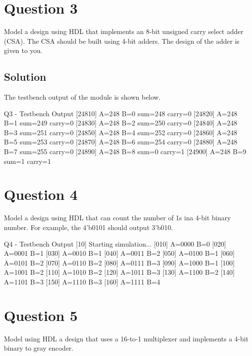 \documentclass[../main.tex]{subfiles}
\begin{document}
\newpage

\section{Question 3}

Model a design using HDL that implements an 8-bit unsigned carry select adder (CSA). The CSA should be built using 4-bit adders. The design of the adder is given to you.

\subsection*{Solution}

The testbench output of the module is shown below.

\begin{mintedterminal}{Q3 - Testbench Output}
[24810] A=248 B=0 sum=248 carry=0
[24820] A=248 B=1 sum=249 carry=0
[24830] A=248 B=2 sum=250 carry=0
[24840] A=248 B=3 sum=251 carry=0
[24850] A=248 B=4 sum=252 carry=0
[24860] A=248 B=5 sum=253 carry=0
[24870] A=248 B=6 sum=254 carry=0
[24880] A=248 B=7 sum=255 carry=0
[24890] A=248 B=8 sum=0 carry=1
[24900] A=248 B=9 sum=1 carry=1
\end{mintedterminal}

\newpage

\section{Question 4}

Model a design using HDL that can count the number of 1s ina  4-bit binary number. For example, the 4'b0101 should output 3'b010.

\begin{mintedterminal}{Q4 - Testbench Output}
[10] Starting simulation...
[010] A=0000 B=0
[020] A=0001 B=1
[030] A=0010 B=1
[040] A=0011 B=2
[050] A=0100 B=1
[060] A=0101 B=2
[070] A=0110 B=2
[080] A=0111 B=3
[090] A=1000 B=1
[100] A=1001 B=2
[110] A=1010 B=2
[120] A=1011 B=3
[130] A=1100 B=2
[140] A=1101 B=3
[150] A=1110 B=3
[160] A=1111 B=4
\end{mintedterminal}

\newpage

\section{Question 5}

Model using HDL a design that uses a 16-to-1 multiplexer and implements a 4-bit binary to gray encoder.
\end{document}
